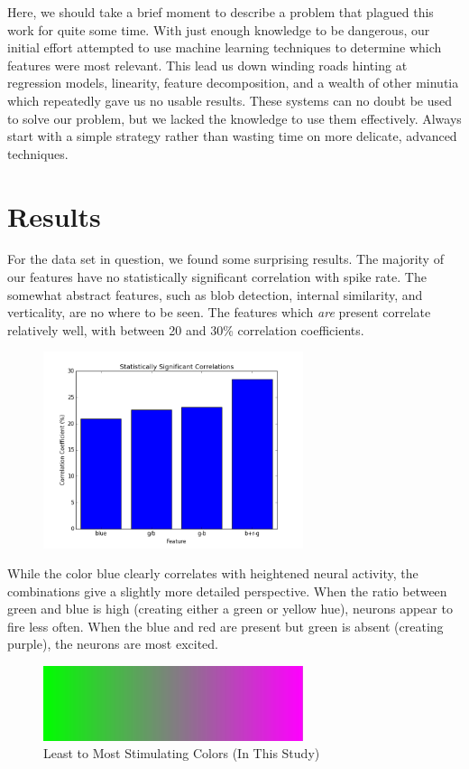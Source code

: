 \documentclass{scrartcl}
\begin{document}
Here, we should take a brief moment to describe a problem that plagued this
work for quite some time. With just enough knowledge to be dangerous, our
initial effort attempted to use machine learning techniques to determine which
features were most relevant. This lead us down winding roads hinting at
regression models, linearity, feature decomposition, and a wealth of other
minutia which repeatedly gave us no usable results. These systems can no doubt
be used to solve our problem, but we lacked the knowledge to use them
effectively. Always start with a simple strategy rather than wasting time on
more delicate, advanced techniques.

\section{Results}

For the data set in question, we found some surprising results. The majority
of our features have no statistically significant correlation with spike rate.
The somewhat abstract features, such as blob detection, internal similarity,
and verticality, are no where to be seen.  The features which {\em are}
present correlate relatively well, with between 20 and 30\% correlation
coefficients. 

\begin{figure}[h]
  \centering
  \includegraphics[width=3in]{significance.png}
\end{figure}

While the color blue clearly correlates with heightened neural activity, the
combinations give a slightly more detailed perspective. When the ratio between
green and blue is high (creating either a green or yellow hue), neurons appear
to fire less often. When the blue and red are present but green is absent
(creating purple), the neurons are most excited. 

\begin{figure}[h]
  \centering
  \includegraphics[width=3in]{spectrum.png}
  \caption{Least to Most Stimulating Colors (In This Study)}
\end{figure}
\end{document}
